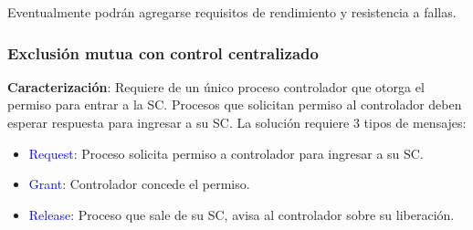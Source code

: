 Eventualmente podrán agregarse requisitos de rendimiento y resistencia a fallas.

\subsubsection{Exclusión mutua con control centralizado}

\textbf{Caracterización}: Requiere de un único proceso controlador que otorga el permiso para entrar a la SC. Procesos que solicitan permiso al controlador deben esperar respuesta para ingresar a su SC. La solución requiere 3 tipos de mensajes: 

\begin{itemize}
    \item \textcolor{blue}{Request}: Proceso solicita permiso a controlador para ingresar a su SC.
    \item \textcolor{blue}{Grant}: Controlador concede el permiso.
    \item \textcolor{blue}{Release}: Proceso que sale de su SC, avisa al controlador sobre su liberación.
\end{itemize}

